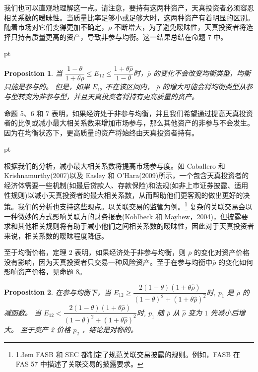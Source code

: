 \documentclass[10.0pt]{article}
\newtheorem{prop}{Proposition}
\begin{document}
我们也可以直观地理解这一点。请注意，要持有这两种资产，天真投资者必须容忍相关系数的暧昧性。当质量比率足够小或足够大时，这两种资产有着明显的区别。随着市场对它们变得更加不确定，$ \overline{\rho} $ 不断增大，为了避免暧昧性，天真投资者将选择只持有质量更高的资产，导致非参与均衡。这一结果总结在命题 7 中。

 pt

\begin{prop}


当 $ \dfrac{1 - \theta}{1 + \theta \hat{\rho}} \leqslant E_{12} \leqslant \dfrac{1 + \theta \hat{\rho}}{1 - \theta} $时，$ \overline{\rho} $ 的变化不会改变均衡类型，均衡只能是参与的。 但是，如果 $ E_{1 2} $ 不在该区间内， $ \overline{\rho} $ 的增大可能会将均衡类型从参与型转变为非参与型，并且天真投资者将持有更高质量的资产。
\end{prop}



命题 5、6 和 7 表明，如果经济处于非参与均衡，并且我们希望通过提高天真投资者的比例或减小最大相关系数来增加市场参与，那么其他资产的非参与不会发生。因为在均衡状态下，更高质量的资产将始终由天真投资者持有。

 pt



根据我们的分析，减小最大相关系数将提高市场参与度。如 Caballero 和 Krishnamurthy(2007)以及 Easley 和 O'Hara(2009)所示，一个包含天真投资者的经济体需要一些机制(如最后贷款人、存款保险)和法规(如非上市证券披露、适用性规则)以减小天真投资者的最大相关系数，从而帮助他们更客观的做出更好的决策。我们的分析也支持这些观点。以关联交易的监管为例。\footnote{\baselineskip1.3em FASB 和 SEC 都制定了规范关联交易披露的规则。例如，FASB 在 FAS 57 中描述了关联交易的披露要求。} 复杂的关联交易会以一种微妙的方式影响关联方的财务报表(Kohlbeck 和 Mayhew，2004)，但披露要求和其他相关规则将有助于减小他们之间相关系数的暧昧性，因此对于天真投资者来说，相关系数的暧昧程度降低。



至于均衡价格，定理 2 表明，如果经济处于非参与均衡，则 $ \overline{\rho} $ 的变化对资产价格没有影响，因为天真投资者只交易一种风险资产。至于在参与均衡中$ \overline{\rho} $ 的变化如何影响资产价格，见命题 8。

\begin{prop}


在参与均衡下，当 $ E_{1 2} \geqslant \dfrac{2 (1 - \theta) (1 + \theta \hat{\rho})}{(1 - \theta)^2 + (1 + \theta\hat{\rho})^2} $时, $ p_1 $ 是 $ \overline{\rho} $ 的减函数。 当 $ E_{1 2} < \dfrac{2 (1 - \theta) (1 + \theta \hat{\rho})}{(1 - \theta)^2 + (1 + \theta\hat{ \rho})^2} $时, $ p_1 $ 随 $ \overline{\rho} $ 从 $ \hat{\rho} $ 变为 $1$ 先减小后增大。 至于资产 2 价格 $ p_2 $ ，结论是对称的。

\end{prop}
\end{document}
